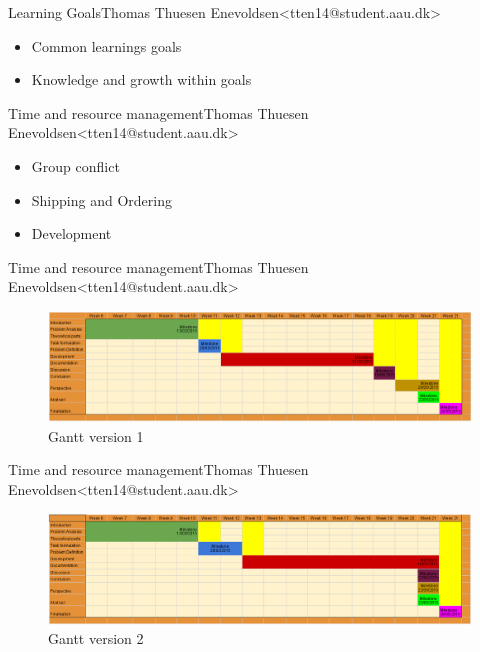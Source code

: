 \begin{frame}{Learning Goals}{Thomas Thuesen Enevoldsen\newline<tten14@student.aau.dk>}
    \begin{itemize}
  	\item Common learnings goals
  	\item Knowledge and growth within goals
  \end{itemize}
\end{frame}

\begin{frame}{Time and resource management}{Thomas Thuesen Enevoldsen\newline<tten14@student.aau.dk>}
	\begin{itemize}
		\item<2-> Group conflict
		\item<3-> Shipping and Ordering
		\item<4-> Development
	\end{itemize}
\end{frame}

\begin{frame}{Time and resource management}{Thomas Thuesen Enevoldsen\newline<tten14@student.aau.dk>}
		\begin{figure}[h!]
    	\includegraphics[width=1\textwidth]{images/gantt1.png}
    	\caption{Gantt version 1}
		\centering    		
	\end{figure}
\end{frame}

\begin{frame}{Time and resource management}{Thomas Thuesen Enevoldsen\newline<tten14@student.aau.dk>}
		\begin{figure}[h!]
    	\includegraphics[width=1\textwidth]{images/gantt2.png}
    	\caption{Gantt version 2}
		\centering    		
	\end{figure}
\end{frame}

